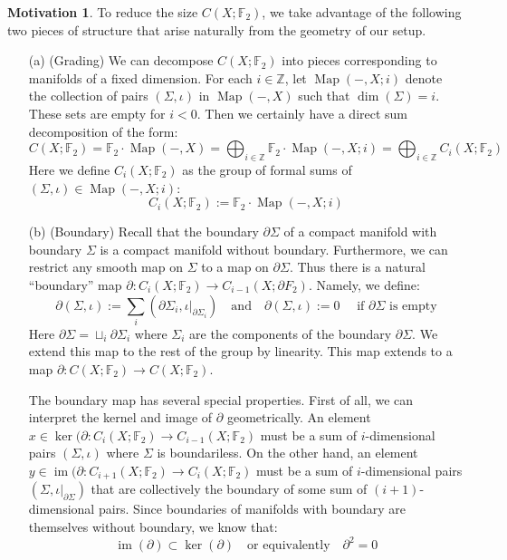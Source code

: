 \documentclass[12pt]{article}
\theoremstyle{definition}
\newtheorem{motivation}[theorem]{Motivation}
\numberwithin{equation}{section}
\newcommand{\Z}{{\mathbb Z}}
\newcommand{\op}{\operatorname}
\begin{document}
\begin{motivation}
To reduce the size $C(X;\mathbb{F}_2)$, we take advantage of the following two pieces of structure that arise naturally from the geometry of our setup.
\begin{itemize}
	\item[(a)] (Grading)  We can decompose $C(X;\mathbb{F}_2)$ into pieces corresponding to manifolds of a fixed dimension. For each $i \in \mathbb{Z}$, let $\op{Map}(-,X;i)$ denote the collection of pairs $(\Sigma,\iota)$ in $\op{Map}(-,X)$ such that $\op{dim}(\Sigma) = i$. These sets are empty for $i < 0$. Then we certainly have a direct sum decomposition of the form:
	\[
	C(X;\mathbb{F}_2) = \mathbb{F}_2 \cdot \op{Map}(-,X) = \bigoplus_{i \in \Z} \mathbb{F}_2 \cdot \op{Map}(-,X;i) = \bigoplus_{i \in \mathbb{Z}} C_i(X;\mathbb{F}_2)
	\]
	Here we define $C_i(X;\mathbb{F}_2)$ as the group of formal sums of $(\Sigma,\iota) \in \op{Map}(-,X;i)$:
	\[
	C_i(X;\mathbb{F}_2) := \mathbb{F}_2 \cdot \op{Map}(-,X;i)
	\]
	\item[(b)] (Boundary) Recall that the boundary $\partial \Sigma$ of a compact manifold with boundary $\Sigma$ is a compact manifold without boundary. Furthermore, we can restrict any smooth map on $\Sigma$ to a map on $\partial \Sigma$. Thus there is a natural ``boundary'' map $\partial:C_i(X;\mathbb{F}_2) \to C_{i-1}(X;\partial{F}_2)$. Namely, we define:
	\[
	\partial(\Sigma,\iota) := \sum_i (\partial \Sigma_i,\iota|_{\partial \Sigma_i}) \quad \text{and} \quad \partial(\Sigma,\iota) := 0 \quad \text{ if $\partial \Sigma$ is empty}
	\]
	Here $\partial \Sigma = \sqcup_i \partial \Sigma_i$ where $\Sigma_i$ are the components of the boundary $\partial \Sigma$. We extend this map to the rest of the group by linearity. This map extends to a map $\partial:C(X;\mathbb{F}_2) \to C(X;\mathbb{F}_2)$. 

	The boundary map has several special properties. First of all, we can interpret the kernel and image of $\partial$ geometrically. An element $x \in \op{ker}(\partial:C_i(X;\mathbb{F}_2) \to C_{i-1}(X;\mathbb{F}_2)$ must be a sum of $i$-dimensional pairs $(\Sigma,\iota)$ where $\Sigma$ is boundariless. On the other hand, an element $y \in \op{im}(\partial:C_{i+1}(X;\mathbb{F}_2) \to C_i(X;\mathbb{F}_2)$ must be a sum of $i$-dimensional pairs $(\Sigma,\iota|_{\partial \Sigma})$ that are collectively the boundary of some sum of $(i+1)$-dimensional pairs. Since boundaries of manifolds with boundary are themselves without boundary, we know that:
	\[
	\op{im}(\partial) \subset \op{ker}(\partial) \quad \text{or equivalently}\quad\partial^2 = 0
	\]
\end{itemize}


\end{motivation}
\end{document}
